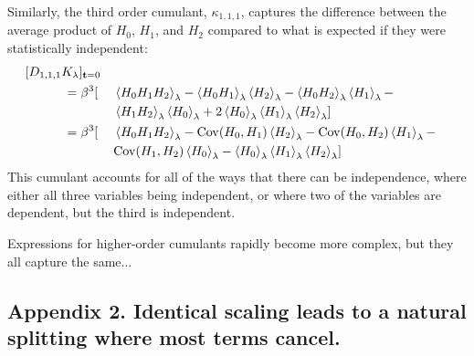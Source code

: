 \documentclass{article}
\let\vec\mathbf
\begin{document}
Similarly, the third order cumulant, $\kappa_{1,1,1}$, captures the difference between the average product of $H_0$, $H_1$, and $H_2$ compared to what is expected if they were statistically independent:
\begin{alignat}{3}
\MoveEqLeft[3] [D_{1, 1, 1} K_\lambda]_{\vec t=0}\notag\\
&= \beta^3[ &&
\left\langle H_0 H_1 H_2 \right\rangle_\lambda -
\left\langle H_0 H_1 \right\rangle_\lambda
	\left\langle H_2 \right\rangle_\lambda -
\left\langle H_0 H_2 \right\rangle_\lambda
	\left\langle H_1 \right\rangle_\lambda - \notag\\
&&& \left\langle H_1 H_2 \right\rangle_\lambda
	\left\langle H_0 \right\rangle_\lambda +
2 \left\langle H_0 \right\rangle_\lambda
	\left\langle H_1 \right\rangle_\lambda
	\left\langle H_2 \right\rangle_\lambda]\notag\\
&= \beta^3[ &&
	\left\langle H_0 H_1 H_2 \right\rangle_\lambda -
	\mathrm{Cov}(H_0,H_1) \left\langle H_2 \right\rangle_\lambda -
	\mathrm{Cov}(H_0,H_2) \left\langle H_1 \right\rangle_\lambda -\\
	&&& \mathrm{Cov}(H_1,H_2) \left\langle H_0 \right\rangle_\lambda -
	\left\langle H_0 \right\rangle_\lambda
		\left\langle H_1 \right\rangle_\lambda
		\left\langle H_2 \right\rangle_\lambda]        
\end{alignat}
This cumulant accounts for all of the ways that there can be independence, where either all three variables being independent, or where two of the variables are dependent, but the third is independent.

Expressions for higher-order cumulants rapidly become more complex, but they all capture the same...





\subsection{Appendix 2. Identical scaling leads to a natural splitting where most terms cancel.}
\end{document}
